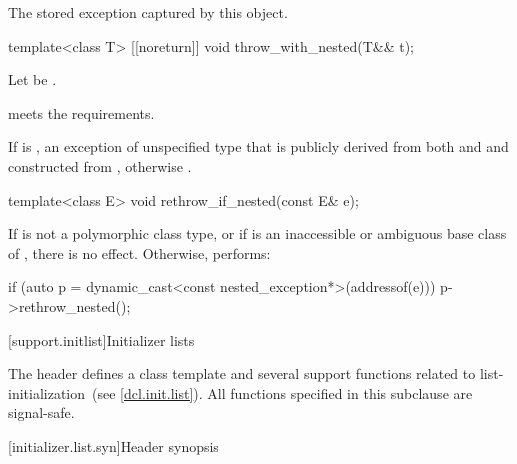 \begin{itemdescr}
\pnum
\returns The stored exception captured by this  object.
\end{itemdescr}

%
\begin{itemdecl}
template<class T> [[noreturn]] void throw_with_nested(T&& t);
\end{itemdecl}

\begin{itemdescr}
\pnum
Let  be .

\pnum
\expects {} meets the  requirements.

\pnum
\throws
If 
is ,
an exception of unspecified type that is publicly derived from both
 and 
and constructed from , otherwise
.
\end{itemdescr}

%
\begin{itemdecl}
template<class E> void rethrow_if_nested(const E& e);
\end{itemdecl}

\begin{itemdescr}
\pnum
\effects
If  is not a polymorphic class type, or
if  is an inaccessible or ambiguous base class of ,
there is no effect.
Otherwise, performs:
\begin{codeblock}
if (auto p = dynamic_cast<const nested_exception*>(addressof(e)))
  p->rethrow_nested();
\end{codeblock}
\end{itemdescr}

[support.initlist]{Initializer lists}

%
\pnum
The header  defines a class template and several
support functions related to list-initialization~(see \ref{dcl.init.list}).
%
All functions specified in this subclause are signal-safe.

[initializer.list.syn]{Header  synopsis}
%
%
%

